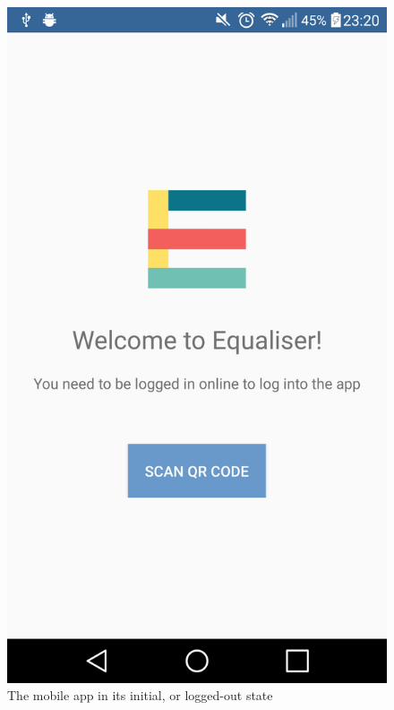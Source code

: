 \documentclass[12pt,a4paper]{bhamdissertation}
\begin{document}
\begin{figure}[!htbp]
  \centering
  \hspace{0.05\textwidth}
  \begin{minipage}[b]{0.4\textwidth}
    \includegraphics[width=\textwidth]{img/app_initial.png}
    \caption{The mobile app in its initial, or logged-out state}
    \label{fig:app_initial}
  \end{minipage}
  \hfill
  \begin{minipage}[b]{0.4\textwidth}

\end{minipage}
\end{figure}
\end{document}
